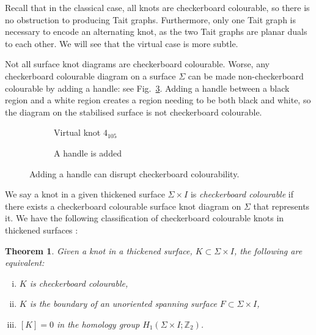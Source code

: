 \documentclass[12pt]{report}
\newcommand{\Z}{\mathbb{Z}}
\newtheorem*{theorem}{Theorem}
\begin{document}
Recall that in the classical case, all knots are checkerboard colourable, so there is no obstruction to producing Tait graphs. Furthermore, only one Tait graph is necessary to encode an alternating knot, as the two Tait graphs are planar duals to each other. We will see that the virtual case is more subtle.

Not all surface knot diagrams are checkerboard colourable. Worse, any checkerboard colourable diagram on a surface $\Sigma$ can be made non-checkerboard colourable by adding a handle: see Fig.~\ref{fig:adding-handle-to-4-105}. Adding a handle between a black region and a white region creates a region needing to be both black and white, so the diagram on the stabilised surface is not checkerboard colourable.

\begin{figure}[hbt]
	\centering
	\hspace*{\fill}
	\begin{subfigure}[b]{0.4 \textwidth}
		\centering
		\def\svgscale{0.35}
		
		\caption{Virtual knot $4_{105}$}
		\label{fig:4-105-vknot}
	\end{subfigure}
	\hspace*{\fill}	\hspace*{\fill}	\hspace*{\fill}
	\begin{subfigure}[b]{0.4 \textwidth}
		\centering
		\def\svgscale{0.35}
		
		\caption{A handle is added}
		\label{fig:4-105-vknot-with-handle}
	\end{subfigure}
	\hspace*{\fill} 
	\caption{Adding a handle can disrupt checkerboard colourability.}
	\label{fig:adding-handle-to-4-105}
\end{figure}

We say a knot in a given thickened surface $\Sigma \times I$ is \textit{checkerboard colourable} if there exists a checkerboard colourable surface knot diagram on $\Sigma$ that represents it. We have the following classification of checkerboard colourable knots in thickened surfaces \cite{minimal-diagrams-surface-links}:

\begin{theorem}
Given a knot in a thickened surface, $K \subset \Sigma \times I$, the following are equivalent:
	\begin{enumerate}[(i)]
	\item $K$ is checkerboard colourable,
	\item $K$ is the boundary of an unoriented spanning surface $F \subset \Sigma \times I$,
	\item $[K] = 0$ in the homology group $H_{1}(\Sigma \times I; \Z_{2})$.
	\end{enumerate} 
\end{theorem}
\end{document}
